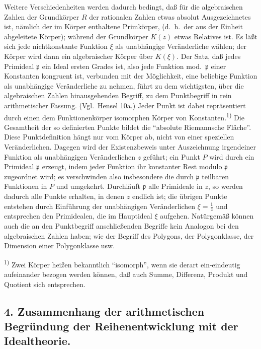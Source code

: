 \documentclass[12pt,a4paper]{article}
\begin{document}
Weitere Verschiedenheiten werden dadurch bedingt, da\ss{} f\"ur die algebraischen Zahlen der Grundk\"orper $R$ der rationalen Zahlen etwas absolut Ausgezeichnetes ist, n\"amlich der im K\"orper enthaltene Primk\"orper, (d.\ h.\ der aus der Einheit abgeleitete K\"orper); w\"ahrend der Grundk\"orper $K(z)$ etwas Relatives ist. Es l\"a\ss{}t sich jede nichtkonstante Funktion $\xi$ als unabh\"angige Ver\"anderliche w\"ahlen; der K\"orper wird dann ein algebraischer K\"orper \"uber $K(\xi)$. Der Satz, da\ss{} jedes Primideal $\mathfrak{p}$ ein Ideal ersten Grades ist, also jede Funktion mod.\ $\mathfrak{p}$ einer Konstanten kongruent ist, verbunden mit der M\"oglichkeit, eine beliebige Funktion als unabh\"angige Ver\"anderliche zu nehmen, f\"uhrt zu dem wichtigsten, \"uber die algebraischen Zahlen hinausgehenden Begriff, zu dem Punktbegriff in rein arithmetischer Fassung. (Vgl.\ Hensel 10a.) Jeder Punkt ist dabei repr\"asentiert durch einen dem Funktionenk\"orper isomorphen K\"orper von Konstanten.\textsuperscript{1)} Die Gesamtheit der so definierten Punkte bildet die ``absolute Riemannsche Fl\"ache''. Diese Punktdefinition h\"angt nur vom K\"orper ab, nicht von einer speziellen Ver\"anderlichen. Dagegen wird der Existenzbeweis unter Auszeichnung irgendeiner Funktion als unabh\"angigen Ver\"anderlichen $z$ gef\"uhrt; ein Punkt $P$ wird durch ein Primideal $\mathfrak{p}$ erzeugt, indem jeder Funktion ihr konstanter Rest modulo $\mathfrak{p}$ zugeordnet wird; es verschwinden also insbesondere die durch $\mathfrak{p}$ teilbaren Funktionen in $P$ und umgekehrt. Durchl\"auft $\mathfrak{p}$ alle Primideale in $z$, so werden dadurch alle Punkte erhalten, in denen $z$ endlich ist; die \"ubrigen Punkte entstehen durch Einf\"uhrung der unabh\"angigen Ver\"anderlichen $\xi=\frac{1}{z}$ und entsprechen den Primidealen, die im Hauptideal $\xi$ aufgehen. Nat\"urgem\"a\ss{} k\"onnen auch die an den Punktbegriff anschlie\ss{}enden Begriffe kein Analogon bei den algebraischen Zahlen haben; wie der Begriff des Polygons, der Polygonklasse, der Dimension einer Polygonklasse usw.

\smallskip
\noindent\textsuperscript{1)} Zwei K\"orper hei\ss{}en bekanntlich ``isomorph'', wenn sie derart ein-eindeutig aufeinander bezogen werden k\"onnen, da\ss{} auch Summe, Differenz, Produkt und Quotient sich entsprechen.

\subsection*{4. Zusammenhang der arithmetischen Begr\"undung der Reihenentwicklung mit der Idealtheorie.}
\end{document}
